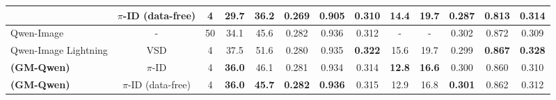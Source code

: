 \begin{table}[t]
{\begin{tabular}{lcccccccccccc}
            & $\pi$-ID (data-free) & 4 & \textbf{29.7} & 36.2 & \textbf{0.269} & \textbf{0.905} & \textbf{0.310} & 14.4 & 19.7 & 0.287 & 0.813 & 0.314 \\
        \midrule
        Qwen-Image 
            & - & 50\texttimes2 & 34.1 & 45.6 & 0.282 & 0.936 & 0.312 & - & - & 0.302 & 0.872 & 0.309 \\
        \midrule
        Qwen-Image Lightning 
            & VSD & 4 & 37.5 & 51.6 & 0.280 & 0.935 & \textbf{0.322} & 15.6 & 19.7 & 0.299 & \textbf{0.867} & \textbf{0.328} \\
        \textbf{\methodname{} (GM-Qwen)} 
            & $\pi$-ID & 4 & \textbf{36.0} & 46.1 & 0.281 & 0.934 & 0.314 & \textbf{12.8} & \textbf{16.6} & 0.300 & 0.860 & 0.310 \\
        \textbf{\methodname{} (GM-Qwen)} 
            & $\pi$-ID (data-free) & 4 & \textbf{36.0} & \textbf{45.7} & \textbf{0.282} & \textbf{0.936} & 0.315 & 12.9 & 16.8 & \textbf{0.301} & 0.862 & 0.312 \\
        \bottomrule
        \end{tabular}
    }
\end{table}

